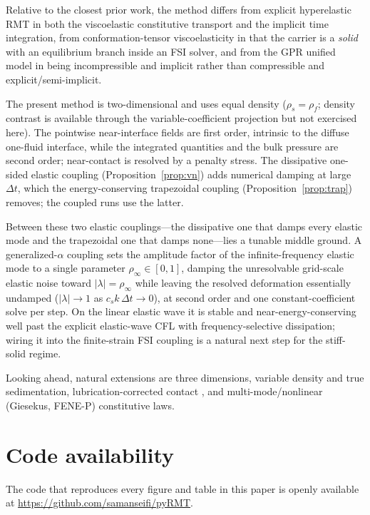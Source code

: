 \documentclass[final,3p,times]{elsarticle}
\theoremstyle{remark}
\newcommand{\dt}{\Delta t}
\begin{document}
Relative to the closest prior work, the method differs from explicit hyperelastic RMT
\cite{Kamrin2012,Rycroft2020,Jain2019} in both the viscoelastic constitutive transport
and the implicit time integration, from conformation-tensor viscoelasticity in that the
carrier is a \emph{solid} with an equilibrium branch inside an FSI solver, and from the
GPR unified model \cite{Peshkov2016,Dumbser2016} in being incompressible and implicit
rather than compressible and explicit/semi-implicit.

The present method is two-dimensional and uses equal density ($\rho_s=\rho_f$; density contrast is
available through the variable-coefficient projection but not exercised here). The pointwise
near-interface fields are first order, intrinsic to the diffuse one-fluid interface, while the
integrated quantities and the bulk pressure are second order; near-contact is resolved by a penalty
stress. The dissipative one-sided
elastic coupling (Proposition~\ref{prop:vn}) adds numerical damping at large $\dt$, which the
energy-conserving trapezoidal coupling (Proposition~\ref{prop:trap}) removes; the coupled runs
use the latter.

Between these two elastic couplings---the dissipative one that damps every elastic mode and the
trapezoidal one that damps none---lies a tunable middle ground. A generalized-$\alpha$ coupling
\cite{ChungHulbert1993} sets the amplitude factor of the infinite-frequency elastic mode to a
single parameter $\rho_\infty\in[0,1]$, damping the unresolvable grid-scale elastic noise toward
$|\lambda|=\rho_\infty$ while leaving the resolved deformation essentially undamped ($|\lambda|\to1$
as $c_s k\,\dt\to0$), at second order and one constant-coefficient solve per step. On the linear
elastic wave it is stable and near-energy-conserving well past the explicit elastic-wave CFL with
frequency-selective dissipation; wiring it into the finite-strain FSI coupling is a natural next
step for the stiff-solid regime.

Looking ahead, natural extensions are three dimensions, variable density and true
sedimentation, lubrication-corrected contact \cite{Fai2018}, and multi-mode/nonlinear
(Giesekus, FENE-P) constitutive laws.

\section*{Code availability}
The code that reproduces every figure and table in this paper is openly available at
\url{https://github.com/samanseifi/pyRMT}.



\end{document}
